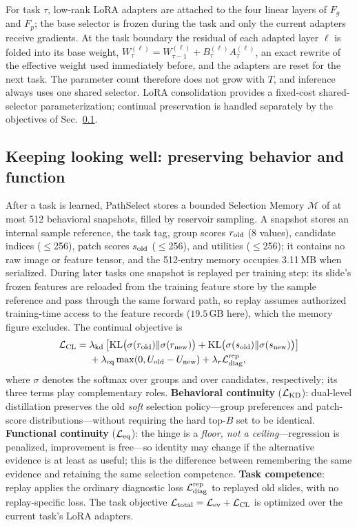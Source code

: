 \documentclass{article}
\def\L{{\cal L}}
\newcommand{\Fg}{F_g}
\newcommand{\Fp}{F_p}
\newcommand{\Mem}{\mathcal{M}}
\begin{document}
For task $\tau$, low-rank LoRA adapters are attached to the four linear layers of $\Fg$ and $\Fp$; the base selector is frozen during the task and only the current adapters receive gradients. At the task boundary the residual of each adapted layer $\ell$ is folded into its base weight, $W^{(\ell)}_{\tau}=W^{(\ell)}_{\tau-1}+B^{(\ell)}_\tau A^{(\ell)}_\tau$, an exact rewrite of the effective weight used immediately before, and the adapters are reset for the next task. The parameter count therefore does not grow with $T$, and inference always uses one shared selector. LoRA consolidation provides a fixed-cost shared-selector parameterization; continual preservation is handled separately by the objectives of Sec.~\ref{ssec:cl}.

\subsection{Keeping looking well: preserving behavior and function}
\label{ssec:cl}

After a task is learned, PathSelect stores a bounded Selection Memory $\Mem$ of at most 512 behavioral snapshots, filled by reservoir sampling. A snapshot stores an internal sample reference, the task tag, group scores $r_{\rm old}$ (8 values), candidate indices ($\le$256), patch scores $s_{\rm old}$ ($\le$256), and utilities ($\le$256); it contains no raw image or feature tensor, and the 512-entry memory occupies 3.11\,MB when serialized. During later tasks one snapshot is replayed per training step: its slide's frozen features are reloaded from the training feature store by the sample reference and pass through the same forward path, so replay assumes authorized training-time access to the feature records ($19.5$\,GB here), which the memory figure excludes. The continual objective is
\begin{align}
\L_{\mathrm{CL}}
={}&
\lambda_{\mathrm{kd}}
\left[
\mathrm{KL}\bigl(\sigma(r_{\mathrm{old}})\Vert \sigma(r_{\mathrm{new}})\bigr)
+
\mathrm{KL}\bigl(\sigma(s_{\mathrm{old}})\Vert \sigma(s_{\mathrm{new}})\bigr)
\right]
\nonumber\\
&+
\lambda_{\mathrm{eq}}
\max(0,U_{\mathrm{old}}-U_{\mathrm{new}})
+
\lambda_r \L_{\mathrm{diag}}^{\mathrm{rep}},
\label{eq:lcl}
\end{align}
where $\sigma$ denotes the softmax over groups and over candidates, respectively; its three terms play complementary roles. \textbf{Behavioral continuity} ($\L_{\rm KD}$): dual-level distillation preserves the old \emph{soft} selection policy---group preferences and patch-score distributions---without requiring the hard top-$B$ set to be identical. \textbf{Functional continuity} ($\L_{\rm eq}$): the hinge is a \emph{floor, not a ceiling}---regression is penalized, improvement is free---so identity may change if the alternative evidence is at least as useful; this is the difference between remembering the same evidence and retaining the same selection competence. \textbf{Task competence}: replay applies the ordinary diagnostic loss $\L_{\mathrm{diag}}^{\mathrm{rep}}$ to replayed old slides, with no replay-specific loss. The task objective $\L_{\mathrm{total}}=\L_{\mathrm{ev}}+\L_{\mathrm{CL}}$ is optimized over the current task's LoRA adapters.
\end{document}
